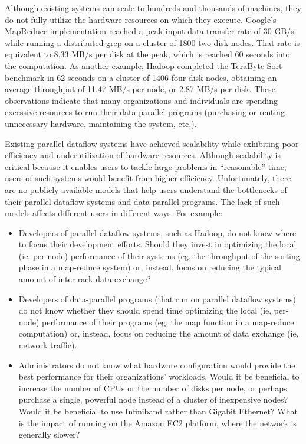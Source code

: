 \documentclass{acm_proc_article-sp}
\begin{document}
Although existing systems can scale to hundreds and thousands of machines, they do not fully utilize the hardware resources on which they execute. Google's MapReduce implementation reached a peak input data transfer rate of 30 GB/s while running a distributed grep on a cluster of 1800 two-disk nodes. That rate is equivalent to 8.33 MB/s per disk at the peak, which is reached 60 seconds into the computation. As another example, Hadoop completed \cite{hadoop2009} the TeraByte Sort benchmark \cite{sortbenchmark} in 62 seconds on a cluster of 1406 four-disk nodes, obtaining an average throughput of 11.47 MB/s per node, or 2.87 MB/s per disk. These observations indicate that many organizations and individuals are spending excessive resources to run their data-parallel programs (purchasing or renting unnecessary hardware, maintaining the system, etc.).

Existing parallel dataflow systems have achieved scalability while exhibiting poor efficiency and underutilization of hardware resources. Although scalability is critical because it enables users to tackle large problems in ``reasonable'' time, users of such systems would benefit from higher efficiency. Unfortunately, there are no publicly available models that help users understand the bottlenecks of their parallel dataflow systems and data-parallel programs. The lack of such models affects different users in different ways. For example:
\begin{itemize}
  \item Developers of parallel dataflow systems, such as Hadoop, do not know
  where to focus their development efforts. Should they invest in optimizing the local (ie, per-node) performance of their systems (eg, the throughput of the sorting phase in a map-reduce system) or, instead, focus on reducing the typical amount of inter-rack data exchange?
  \item Developers of data-parallel programs (that run on parallel dataflow
  systems) do not know whether they should spend time optimizing the local (ie,
  per-node) performance of their programs (eg, the map function in a map-reduce
  computation) or, instead, focus on reducing the amount of data exchange (ie,
  network traffic).
  \item Administrators do not know what hardware configuration would provide
  the best performance for their organizations' workloads. Would it be
  beneficial to increase the number of CPUs or the number of disks per node, or
  perhaps purchase a single, powerful node instead of a cluster of inexpensive
  nodes? Would it be beneficial to use Infiniband rather than Gigabit Ethernet?
  What is the impact of running on the Amazon EC2 \cite{amazonec2} platform,
  where the network is generally slower?
\end{itemize}
\end{document}
